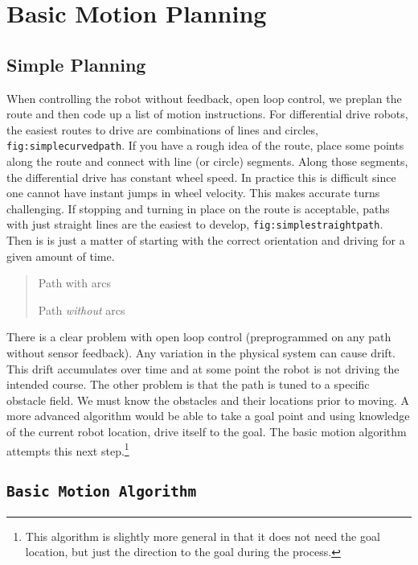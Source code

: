 \hypertarget{basic-motion-planning}{%
\section{Basic Motion Planning}\label{basic-motion-planning}}

\hypertarget{simple-planning}{%
\subsection{Simple Planning}\label{simple-planning}}

When controlling the robot without feedback, open loop control, we
preplan the route and then code up a list of motion instructions. For
differential drive robots, the easiest routes to drive are combinations
of lines and circles, \texttt{fig:simplecurvedpath}. If you have a rough
idea of the route, place some points along the route and connect with
line (or circle) segments. Along those segments, the differential drive
has constant wheel speed. In practice this is difficult since one cannot
have instant jumps in wheel velocity. This makes accurate turns
challenging. If stopping and turning in place on the route is
acceptable, paths with just straight lines are the easiest to develop,
\texttt{fig:simplestraightpath}. Then is is just a matter of starting
with the correct orientation and driving for a given amount of time.

\begin{quote}
Path with arcs

Path \emph{without} arcs
\end{quote}

There is a clear problem with open loop control (preprogrammed on any
path without sensor feedback). Any variation in the physical system can
cause drift. This drift accumulates over time and at some point the
robot is not driving the intended course. The other problem is that the
path is tuned to a specific obstacle field. We must know the obstacles
and their locations prior to moving. A more advanced algorithm would be
able to take a goal point and using knowledge of the current robot
location, drive itself to the goal. The basic motion algorithm attempts
this next step.\footnote{This algorithm is slightly more general in that
  it does not need the goal location, but just the direction to the goal
  during the process.}

\hypertarget{basic-motion-algorithm}{%
\subsection{\texorpdfstring{\texttt{Basic\ Motion\ Algorithm}}{Basic Motion Algorithm}}\label{basic-motion-algorithm}}

